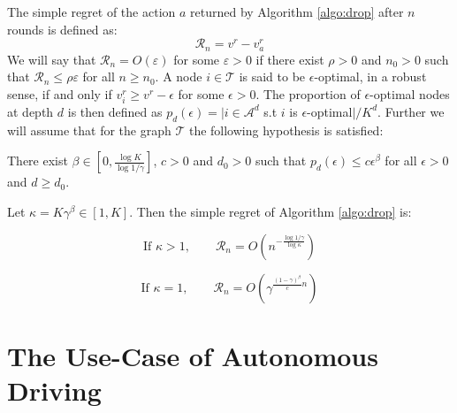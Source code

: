 \documentclass{article}
\begin{document}
The simple regret of the action $a$ returned by Algorithm \ref{algo:drop} after $n$ rounds is defined as:
\begin{equation}
\mathcal{R}_n = v^r - v_a^r
\end{equation}
We will say that $\mathcal{R}_n=O(\varepsilon)$ for some $\varepsilon>0$ if there exist $\rho>0$ and $n_0>0$ such that $\mathcal{R}_n\leq\rho\varepsilon$ for all $n\geq n_0$.
A node $i\in\mathcal{T}$ is said to be $\epsilon$-optimal, in a robust sense, if and only if $v_i^r \geq v^r - \epsilon$ for some $\epsilon > 0$. The proportion of $\epsilon$-optimal nodes at depth $d$ is then defined as $p_d(\epsilon) = |i \in \mathcal{A}^d$ s.t $i$ is $\epsilon$-optimal$|/K^d$. Further we will assume that for the graph $\mathcal{T}$ the following hypothesis is satisfied:
\begin{assumption}
\label{assumpt:beta}
There exist $\beta\in[0, \frac{\log K}{\log 1/\gamma}]$, $c > 0$ and $d_0 > 0$ such that $p_d(\epsilon)\leq c\epsilon^\beta$ for all $\epsilon > 0$ and $d\geq d_0$.
\end{assumption}

\begin{theorem}
\label{theorem:drop-regret}
Let $\kappa = K\gamma^\beta \in [1, K]$. Then the simple regret of Algorithm \ref{algo:drop} is:


\begin{equation}
\text{If } \kappa>1,\qquad 
\mathcal{R}_n = O\left(n^{-\frac{\log 1/\gamma}{\log \kappa}}\right)
\end{equation}

\begin{equation}
\text{If }\kappa=1,\qquad
\mathcal{R}_n = O\left(\gamma^{\frac{(1-\gamma)^\beta}{c}n}\right)
\end{equation}
\end{theorem}

\section{The Use-Case of Autonomous Driving}
\end{document}
